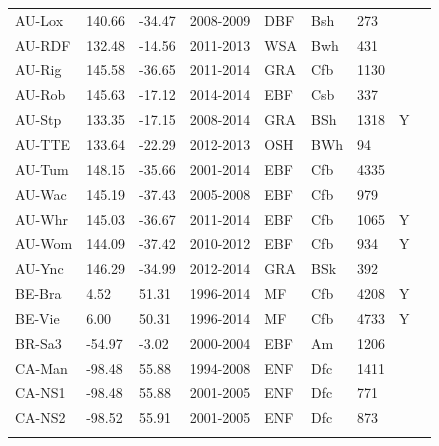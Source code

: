 \documentclass[gmd, manuscript]{copernicus}
\begin{document}
\begin{table}[t]
\begin{tabular}{lllllllll}
  AU-Lox & 140.66 & -34.47 & 2008-2009 & DBF & Bsh & 273 &  & \citet{AU-Lox} \\ 
  AU-RDF & 132.48 & -14.56 & 2011-2013 & WSA & Bwh & 431 &  & \citet{AU-RDF} \\ 
  AU-Rig & 145.58 & -36.65 & 2011-2014 & GRA & Cfb & 1130 &  & \citet{AU-Rig} \\ 
  AU-Rob & 145.63 & -17.12 & 2014-2014 & EBF & Csb & 337 &  & \citet{AU-Rob} \\ 
  AU-Stp & 133.35 & -17.15 & 2008-2014 & GRA & BSh & 1318 & Y & \citet{AU-Stp} \\ 
  AU-TTE & 133.64 & -22.29 & 2012-2013 & OSH & BWh &  94 &  & \citet{AU-TTE} \\ 
  AU-Tum & 148.15 & -35.66 & 2001-2014 & EBF & Cfb & 4335 &  & \citet{AU-Tum} \\ 
  AU-Wac & 145.19 & -37.43 & 2005-2008 & EBF & Cfb & 979 &  & \citet{AU-Wac} \\ 
  AU-Whr & 145.03 & -36.67 & 2011-2014 & EBF & Cfb & 1065 & Y & \citet{AU-Whr} \\ 
  AU-Wom & 144.09 & -37.42 & 2010-2012 & EBF & Cfb & 934 & Y & \citet{AU-Wom} \\ 
  AU-Ync & 146.29 & -34.99 & 2012-2014 & GRA & BSk & 392 &  & \citet{AU-Ync} \\ 
  BE-Bra & 4.52 & 51.31 & 1996-2014 & MF & Cfb & 4208 & Y & \citet{BE-Bra} \\ 
  BE-Vie & 6.00 & 50.31 & 1996-2014 & MF & Cfb & 4733 & Y & \citet{BE-Vie} \\ 
  BR-Sa3 & -54.97 & -3.02 & 2000-2004 & EBF & Am & 1206 &  & \citet{BR-Sa3} \\ 
  CA-Man & -98.48 & 55.88 & 1994-2008 & ENF & Dfc & 1411 &  & \citet{CA-Man} \\ 
  CA-NS1 & -98.48 & 55.88 & 2001-2005 & ENF & Dfc & 771 &  & \citet{CA-NS1} \\ 
  CA-NS2 & -98.52 & 55.91 & 2001-2005 & ENF & Dfc & 873 &  & \citet{CA-NS2} \\ 
    \bottomhline
\end{tabular}
\label{tab:sites}
\end{table}
\clearpage
\end{document}
